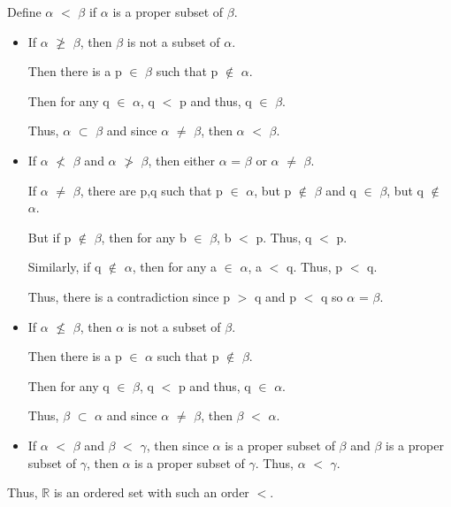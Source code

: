 	\begin{adjustbox}{minipage=14cm, right, vspace=0.1cm 0cm}
		Define $\alpha$ $<$ $\beta$ if $\alpha$ is a proper subset of $\beta$.

		\begin{itemize}[leftmargin=1cm, itemsep=0.1cm]
			\item If $\alpha$ $\not \geq$ $\beta$, then $\beta$ is not a subset of $\alpha$.

				Then there is a p $\in$ $\beta$ such that p $\not \in$ $\alpha$.

				Then for any q $\in$ $\alpha$, q $<$ p and thus, q $\in$ $\beta$.

				Thus, $\alpha$ $\subset$ $\beta$ and since $\alpha$ $\neq$ $\beta$,
				then $\alpha$ $<$ $\beta$.

			\item If $\alpha$ $\not <$ $\beta$ and $\alpha$ $\not >$ $\beta$,
				then either $\alpha$ = $\beta$ or $\alpha$ $\neq$ $\beta$.

				If $\alpha$ $\neq$ $\beta$, there are p,q such that
				p $\in$ $\alpha$, but p $\not \in$ $\beta$ and q $\in$ $\beta$,
				but q $\not \in$ $\alpha$.

				But if p $\not \in$ $\beta$, then for any b $\in$ $\beta$, b $<$ p.
				Thus, q $<$ p.

				Similarly, if q $\not \in$ $\alpha$, then for any a $\in$ $\alpha$,
				a $<$ q. Thus, p $<$ q.

				Thus, there is a contradiction since p $>$ q and p $<$ q so
				$\alpha$ = $\beta$.

			\item If $\alpha$ $\not \leq$ $\beta$, then $\alpha$ is not a subset of $\beta$.

				Then there is a p $\in$ $\alpha$ such that p $\not \in$ $\beta$.

				Then for any q $\in$ $\beta$, q $<$ p and thus, q $\in$ $\alpha$.

				Thus, $\beta$ $\subset$ $\alpha$ and since $\alpha$ $\neq$ $\beta$,
				then $\beta$ $<$ $\alpha$.

			\item If $\alpha$ $<$ $\beta$ and $\beta$ $<$ $\gamma$, then since
				$\alpha$ is a proper subset of $\beta$ and $\beta$ is a proper subset
				of $\gamma$, then $\alpha$ is a proper subset of $\gamma$.
				Thus, $\alpha$ $<$ $\gamma$.
		\end{itemize}

		Thus, $\mathbb{R}$ is an ordered set with such an order $<$. \\
	\end{adjustbox}

